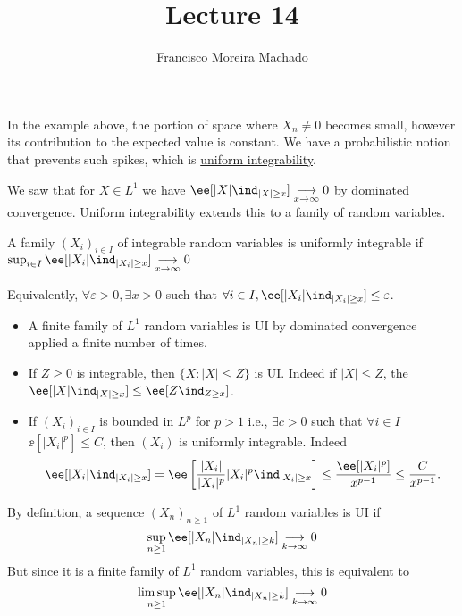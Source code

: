 \documentclass[../main.tex]{subfiles}
\author{Francisco Moreira Machado}
\title{Lecture 14}
\begin{document}
In the example above, the portion of space where $X_n \neq 0$ becomes small, 
however its contribution to the expected value is constant. We have 
a probabilistic notion that prevents such spikes, which is \underline{uniform
integrability}.

\vspace{0.5em}

\noindent
We saw that for $X \in L^1$ we have $\ee[|X| \ind_{|X| \geq x}] \underset{x \to
\infty}{\longrightarrow} 0$ by dominated convergence.
Uniform integrability extends this to a family of random variables.

\begin{definition}
  A family $(X_i)_{i \in I}$ of integrable random variables is uniformly
  integrable if $\sup_{i \in I} \ee[|X_i| \ind_{|X_i| \geq x}] \underset{x \to
  \infty}{\longrightarrow}0$
\end{definition}

Equivalently, $\forall \varepsilon > 0, \exists x > 0$ such that $\forall i \in
I, \ee[|X_i| \ind_{|X_i| \geq x}] \leq \varepsilon$.

\begin{example}
    \hfill
    \begin{itemize}
      \item A finite family of $L^1$ random variables is UI by dominated
        convergence applied a finite number of times.
      \item If $Z \geq 0$ is integrable, then $\{ X \colon |X| \leq Z \} $ is
        UI. Indeed if $|X| \leq Z$, the $\ee[|X| \ind_{|X|\geq x}] \leq \ee[Z
        \ind_{Z \geq x}]$.
      \item If $(X_i)_{i \in I}$ is bounded in $L^p$ for $p > 1$ i.e., $\exists
        c>0$ such that $\forall i \in I$ $\ee[|X_i|^p] \leq C$, then $(X_i)$ is
        uniformly integrable. Indeed 
        \[
          \ee[|X_i|\ind_{|X_i| \geq x}] = 
          \ee\left[\frac{|X_i|}{|X_i|^p} |X_i|^p\ind_{|X_i| \geq x}\right] \leq
          \frac{\ee[|X_i|^p]}{x^{p-1}} \leq \frac{C}{x^{p-1}} 
        .\] 
    \end{itemize}
\end{example}

\begin{remark}
  By definition, a sequence $(X_n)_{n \geq 1}$ of $L^1$ random variables is UI
  if $$\sup_{n \geq 1} \ee[|X_n|\ind_{|X_n| \geq k}] \underset{k \to
  \infty}{\longrightarrow}0$$ But since it is a finite family of  $L^1$ random
  variables, this is equivalent to
  $$\limsup_{n \geq 1} \ee[|X_n|\ind_{|X_n| \geq k}] \underset{k \to
  \infty}{\longrightarrow}0$$
\end{remark}
\end{document}
